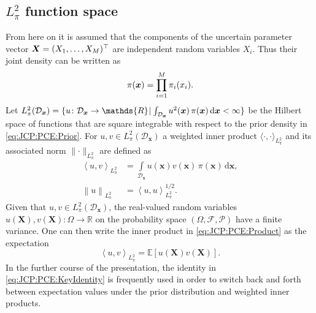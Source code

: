 \subsection{\(L_{\pi}^2\) function space}
From here on it is assumed that the components of the uncertain parameter vector \(\bm{X} = (X_1,\ldots,X_M)^\top\) are independent random variables \(X_i\).
Thus their joint density can be written as
\begin{equation} \label{eq:JCP:PCE:Prior}
  \pi(\bm{x}) = \prod\limits_{i=1}^M \pi_i(x_i).
\end{equation}
Let \(L_{\pi}^2(\mathcal{D}_{\bm{x}}) = \{u \colon \mathcal{D}_{\bm{x}} \rightarrow \mathds{R} \cond \int_{\mathcal{D}_{\bm{x}}} u^2(\bm{x}) \, \pi(\bm{x}) \, \mathrm{d} \bm{x} < \infty\}\)
be the Hilbert space of functions that are square integrable with respect to the prior density in \cref{eq:JCP:PCE:Prior}.
For \(u,v \in L_{\pi}^2(\mathcal{D}_{\bm{x}})\) a weighted inner product \(\langle \cdot,\cdot \rangle_{L_{\pi}^2}\) and its associated norm \(\lVert \cdot \rVert_{L_{\pi}^2}\) are defined as
\begin{align}
  \left\langle u,v \right\rangle_{L_{\pi}^2} &= \int\limits_{\mathcal{D}_{\bm{x}}} u(\bm{x}) v(\bm{x}) \, \pi(\bm{x}) \, \mathrm{d} \bm{x}, \label{eq:JCP:PCE:Product} \\
  \left\lVert u \right\rVert_{L_{\pi}^2} &= \left\langle u,u \right\rangle_{L_{\pi}^2}^{1/2}. \label{eq:JCP:PCE:Norm}
\end{align}
Given that \(u,v \in L_{\pi}^2(\mathcal{D}_{\bm{x}})\),
the real-valued random variables \(u(\bm{X}),v(\bm{X}) \colon \Omega \rightarrow \mathds{R}\) on the probability space \((\Omega,\mathcal{F},\mathcal{P})\) have a finite variance.
One can then write the inner product in \cref{eq:JCP:PCE:Product} as the expectation
\begin{equation} \label{eq:JCP:PCE:KeyIdentity}
  \left\langle u, v \right\rangle_{L_{\pi}^2} = \mathds{E}[u(\bm{X}) v(\bm{X})].
\end{equation}
In the further course of the presentation, the identity in \cref{eq:JCP:PCE:KeyIdentity} is frequently used
in order to switch back and forth between expectation values under the prior distribution and weighted inner products.

